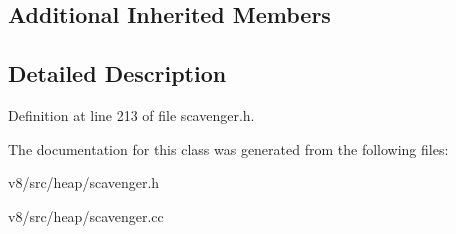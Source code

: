 \subsection*{Additional Inherited Members}


\subsection{Detailed Description}


Definition at line 213 of file scavenger.\+h.



The documentation for this class was generated from the following files\+:\begin{DoxyCompactItemize}
\item 
v8/src/heap/scavenger.\+h\item 
v8/src/heap/scavenger.\+cc\end{DoxyCompactItemize}
